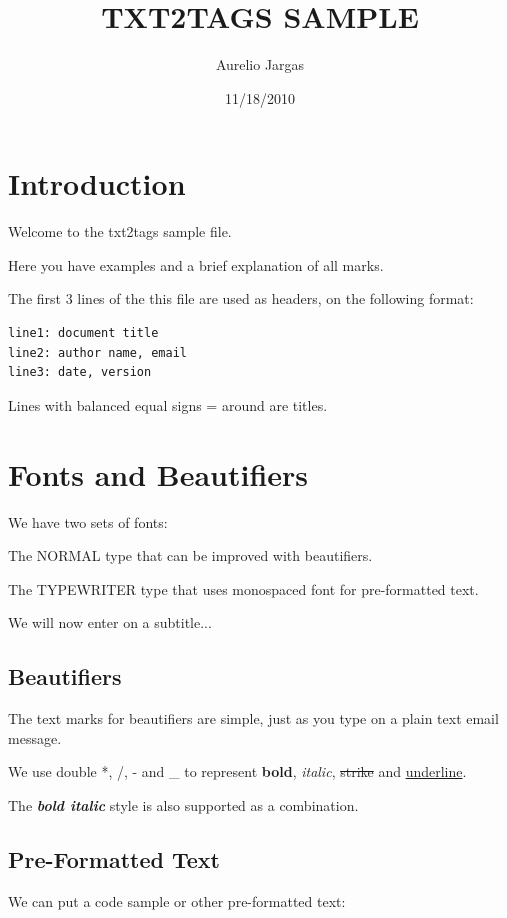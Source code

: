\documentclass{article}
\title{TXT2TAGS SAMPLE}
\author{Aurelio Jargas}
\begin{document}
\date{11/18/2010}
\maketitle
\clearpage


\section*{Introduction}

Welcome to the txt2tags sample file.

Here you have examples and a brief explanation of all
marks.

The first 3 lines of the this file are used as headers,
on the following format:

\begin{verbatim}
line1: document title
line2: author name, email
line3: date, version
\end{verbatim}

Lines with balanced equal signs = around are titles.

\section*{Fonts and Beautifiers}

We have two sets of fonts:

The NORMAL type that can be improved with beautifiers.

The TYPEWRITER type that uses monospaced font for
pre-formatted text.

We will now enter on a subtitle...

\subsection*{Beautifiers}

The text marks for beautifiers are simple, just as you
type on a plain text email message.

We use double *, /, - and \_ to represent \textbf{bold},
\textit{italic}, \sout{strike} and \underline{underline}.

The \textbf{\textit{bold italic}} style is also supported as a
combination.

\subsection*{Pre-Formatted Text}

We can put a code sample or other pre-formatted text:
\end{document}
